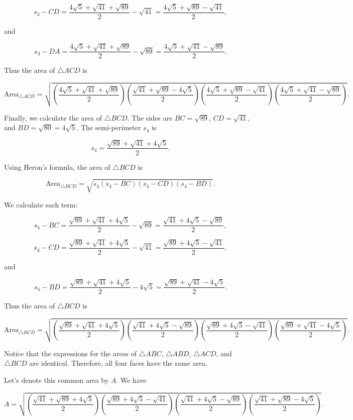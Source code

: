 \[ s_3 - CD = \frac{4 \sqrt{5} + \sqrt{41} + \sqrt{89}}{2} - \sqrt{41} = \frac{4 \sqrt{5} + \sqrt{89} - \sqrt{41}}{2}, \]

and

\[ s_3 - DA = \frac{4 \sqrt{5} + \sqrt{41} + \sqrt{89}}{2} - \sqrt{89} = \frac{4 \sqrt{5} + \sqrt{41} - \sqrt{89}}{2}. \]

Thus the area of $\triangle ACD$ is

\[ \text{Area}_{\triangle ACD} = \sqrt{\left(\frac{4 \sqrt{5} + \sqrt{41} + \sqrt{89}}{2}\right) \left(\frac{\sqrt{41} + \sqrt{89} - 4 \sqrt{5}}{2}\right) \left(\frac{4 \sqrt{5} + \sqrt{89} - \sqrt{41}}{2}\right) \left(\frac{4 \sqrt{5} + \sqrt{41} - \sqrt{89}}{2}\right)}. \]

Finally, we calculate the area of $\triangle BCD$. The sides are $BC = \sqrt{89}$, $CD = \sqrt{41}$, and $BD = \sqrt{80} = 4 \sqrt{5}$. The semi-perimeter $s_4$ is

\[ s_4 = \frac{\sqrt{89} + \sqrt{41} + 4 \sqrt{5}}{2}. \]

Using Heron's formula, the area of $\triangle BCD$ is

\[ \text{Area}_{\triangle BCD} = \sqrt{s_4 (s_4 - BC)(s_4 - CD)(s_4 - BD)}. \]

We calculate each term:

\[ s_4 - BC = \frac{\sqrt{89} + \sqrt{41} + 4 \sqrt{5}}{2} - \sqrt{89} = \frac{\sqrt{41} + 4 \sqrt{5} - \sqrt{89}}{2}, \]

\[ s_4 - CD = \frac{\sqrt{89} + \sqrt{41} + 4 \sqrt{5}}{2} - \sqrt{41} = \frac{\sqrt{89} + 4 \sqrt{5} - \sqrt{41}}{2}, \]

and

\[ s_4 - BD = \frac{\sqrt{89} + \sqrt{41} + 4 \sqrt{5}}{2} - 4 \sqrt{5} = \frac{\sqrt{89} + \sqrt{41} - 4 \sqrt{5}}{2}. \]

Thus the area of $\triangle BCD$ is

\[ \text{Area}_{\triangle BCD} = \sqrt{\left(\frac{\sqrt{89} + \sqrt{41} + 4 \sqrt{5}}{2}\right) \left(\frac{\sqrt{41} + 4 \sqrt{5} - \sqrt{89}}{2}\right) \left(\frac{\sqrt{89} + 4 \sqrt{5} - \sqrt{41}}{2}\right) \left(\frac{\sqrt{89} + \sqrt{41} - 4 \sqrt{5}}{2}\right)}. \]

Notice that the expressions for the areas of $\triangle ABC$, $\triangle ABD$, $\triangle ACD$, and $\triangle BCD$ are identical. Therefore, all four faces have the same area.

Let's denote this common area by $A$. We have

\[ A = \sqrt{\left(\frac{\sqrt{41} + \sqrt{89} + 4 \sqrt{5}}{2}\right) \left(\frac{\sqrt{89} + 4 \sqrt{5} - \sqrt{41}}{2}\right) \left(\frac{\sqrt{41} + 4 \sqrt{5} - \sqrt{89}}{2}\right) \left(\frac{\sqrt{41} + \sqrt{89} - 4 \sqrt{5}}{2}\right)}. \]

